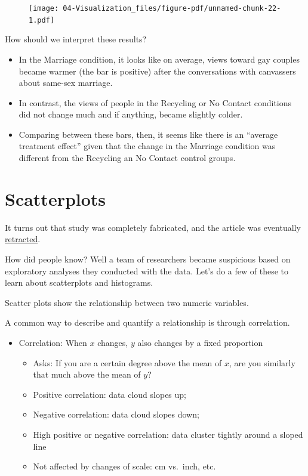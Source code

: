 \documentclass[
  letterpaper,
  DIV=11,
  numbers=noendperiod]{scrreprt}
\providecommand{\tightlist}{%
  \setlength{\itemsep}{0pt}\setlength{\parskip}{0pt}}\usepackage{longtable,booktabs,array}
\begin{document}
\begin{figure}[H]

{\centering \texttt{[image: 04-Visualization\_files/figure-pdf/unnamed-chunk-22-1.pdf]}

}

\end{figure}

How should we interpret these results?

\begin{itemize}
\tightlist
\item
  In the Marriage condition, it looks like on average, views toward gay
  couples became warmer (the bar is positive) after the conversations
  with canvassers about same-sex marriage.
\item
  In contrast, the views of people in the Recycling or No Contact
  conditions did not change much and if anything, became slightly
  colder.
\item
  Comparing between these bars, then, it seems like there is an
  ``average treatment effect'' given that the change in the Marriage
  condition was different from the Recycling an No Contact control
  groups.
\end{itemize}

\hypertarget{scatterplots}{%
\section{Scatterplots}\label{scatterplots}}

It turns out that study was completely fabricated, and the article was
eventually
\href{https://www.newyorker.com/science/maria-konnikova/how-a-gay-marriage-study-went-wrong}{retracted}.

How did people know? Well a team of researchers became suspicious based
on exploratory analyses they conducted with the data. Let's do a few of
these to learn about scatterplots and histograms.

Scatter plots show the relationship between two numeric variables.

A common way to describe and quantify a relationship is through
correlation.

\begin{itemize}
\tightlist
\item
  Correlation: When \(x\) changes, \(y\) also changes by a fixed
  proportion

  \begin{itemize}
  \tightlist
  \item
    Asks: If you are a certain degree above the mean of \(x\), are you
    similarly that much above the mean of \(y\)?
  \item
    Positive correlation: data cloud slopes up;
  \item
    Negative correlation: data cloud slopes down;
  \item
    High positive or negative correlation: data cluster tightly around a
    sloped line
  \item
    Not affected by changes of scale: cm vs.~inch, etc.
  \end{itemize}
\end{itemize}
\end{document}
